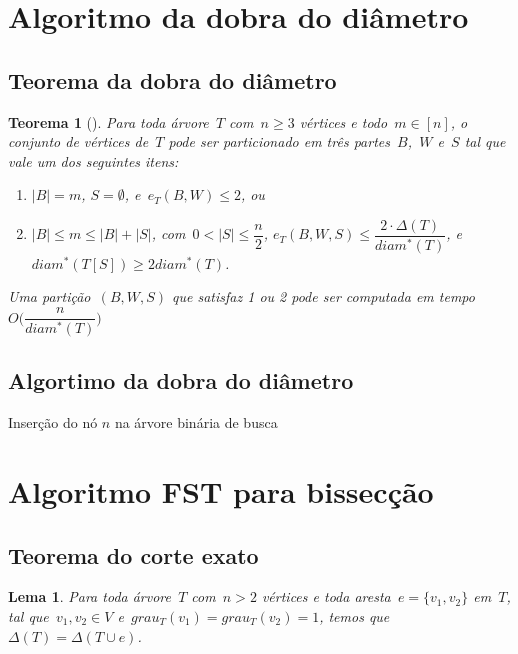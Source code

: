 \documentclass[a4paper,12pt]{article}
\newtheorem{teo}{Teorema}
\newtheorem{lem}{Lema}
\begin{document}
\section {Algoritmo da dobra do diâmetro}
	
	\subsection{Teorema da dobra do diâmetro}
	
		\begin{teo}[{\cite[Theorem 4]{Schmidt15}}]
		\label{teo:dobraDiametro}
			Para toda árvore~$T$ com~$n\ge 3$ vértices e 
			todo~$m\in [n]$,
			o conjunto de vértices de~$T$ pode ser particionado em 
			três partes~$B$,~$W$ e~$S$ tal que vale um dos 
			seguintes itens:
			\begin{enumerate}
				\item $|B|=m$, $S=\emptyset$, e~$e_T(B,W)\le 2$, ou
				\item $|B|\le m\le |B|+|S|$, 
				com~$0<|S|\le\dfrac{n}{2}$,
				$e_T(B,W,S)\le \dfrac{2\cdot 
				\Delta(T)}{diam^*(T)}$, 
				e~$diam^*(T[S])\ge 2diam^*(T)$.
			\end{enumerate}
			Uma partição~$(B,W,S)$ que satisfaz 1 ou 2 pode ser
			computada em tempo~$O\Big(\dfrac{n}{diam^*(T)}\Big)$ 
		\end{teo}

	\medskip
	\medskip


	\subsection{Algortimo da dobra do diâmetro}
	\begin{algorithm}[H]
	\label{alg:dobraDiametro}

		\caption{Inserção do nó $n$ na árvore binária de busca}
		\Output{}

	\end{algorithm}	

\newpage
\section {Algoritmo FST para bissecção}

	\subsection{Teorema do corte exato}
	\begin{lem}
	\label{lem:grauMaximo}
		Para toda árvore~$T$ com~$n>2$ vértices
		e toda aresta~$e=\{v_1,v_2\}$ em~$T$, 
		tal que~$v_1,v_2\in V$ e~$grau_T(v_1)=grau_T(v_2)=1$,
		temos que~$\Delta(T) = \Delta(T\cup e)$.
	\end{lem}
	
\end{document}
